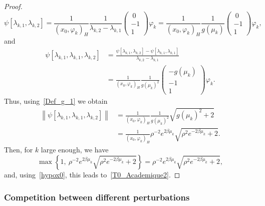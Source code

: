 \documentclass[AHL,Unicode,longabstracts]{cedram}
\newcommand{\normeX}[1]{\left\| #1 \right\|}
\newcommand{\psH}[2]{\left(#1, #2 \right)_H}
\begin{document}
\begin{proof}
\begin{equation*}
\psi[\lambda_{k,1}, \lambda_{k,2}] = \frac{1}{\psH{x_0}{\varphi_k}} \frac{1}{\lambda_{k,2}-\lambda_{k,1}}
\begin{pmatrix} \ 0\\-1\\1
\end{pmatrix} \varphi_k
= \frac{1}{\psH{x_0}{\varphi_k}} \frac{1}{g(\mu_k)}
\begin{pmatrix} \ 0\\-1\\1
\end{pmatrix} \varphi_k,
\end{equation*}
and
\begin{align*}
\psi[\lambda_{k,1},\lambda_{k,1},\lambda_{k,2}] &= \frac{\psi[\lambda_{k,1},\lambda_{k,2}]-\psi[\lambda_{k,1},\lambda_{k,1}]}{\lambda_{k,2}-\lambda_{k,1}}
\\
&= \frac{1}{\psH{x_0}{\varphi_k}} \frac{1}{g(\mu_k)^2 }
\begin{pmatrix} -g(\mu_k) \\ -1 \\ 1
\end{pmatrix} \varphi_k.
\end{align*}
Thus, using~\eqref{Def_g_1} we obtain
\begin{align*}
\normeX{ \psi[\lambda_{k,1}, \lambda_{k,1}, \lambda_{k,2}] } &= \frac{1}{\psH{x_0}{\varphi_k}} \frac{1}{g(\mu_k)^2 } \sqrt{g(\mu_k)^2+2}
\\
&= \frac{1}{\psH{x_0}{\varphi_k}} \rho^{-2} e^{2\beta \mu_k} \sqrt{\rho^2 e^{-2\beta \mu_k}+2}.
\end{align*}
Then, for $k$ large enough, we have
\[
\max \left\{ 1, \: \rho^{-2}e^{2\beta \mu_k} \sqrt{\rho^2 e^{-2\beta \mu_k}+2} \right\} = \rho^{-2} e^{2\beta \mu_k} \sqrt{\rho^2 e^{-2\beta \mu_k}+2},
\]
and, using~\eqref{hypox0}, this leads to~\eqref{T0_Academique2}.
\end{proof}



\subsubsection{Competition between different perturbations}\label{secexample3x3}
\end{document}
